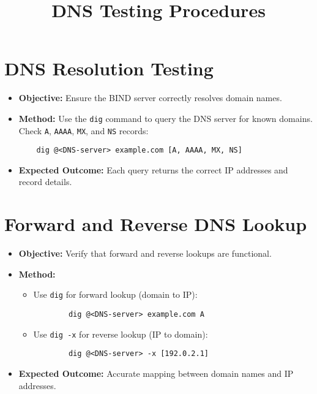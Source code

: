 \documentclass[a4paper,12pt]{article}
\begin{document}
\title{DNS Testing Procedures}
\author{}
\date{}
\maketitle

\section*{DNS Resolution Testing}
\begin{itemize}[leftmargin=1.5cm]
    \item \textbf{Objective:} Ensure the BIND server correctly resolves domain names.
    \item \textbf{Method:} Use the \texttt{dig} command to query the DNS server for known domains. Check \texttt{A}, \texttt{AAAA}, \texttt{MX}, and \texttt{NS} records:
    \begin{verbatim}
    dig @<DNS-server> example.com [A, AAAA, MX, NS]
    \end{verbatim}
    \item \textbf{Expected Outcome:} Each query returns the correct IP addresses and record details.
\end{itemize}

\section*{Forward and Reverse DNS Lookup}
\begin{itemize}[leftmargin=1.5cm]
    \item \textbf{Objective:} Verify that forward and reverse lookups are functional.
    \item \textbf{Method:}
    \begin{itemize}
        \item Use \texttt{dig} for forward lookup (domain to IP):
        \begin{verbatim}
        dig @<DNS-server> example.com A
        \end{verbatim}
        \item Use \texttt{dig -x} for reverse lookup (IP to domain):
        \begin{verbatim}
        dig @<DNS-server> -x [192.0.2.1]
        \end{verbatim}
    \end{itemize}
    \item \textbf{Expected Outcome:} Accurate mapping between domain names and IP addresses.
\end{itemize}
\end{document}
